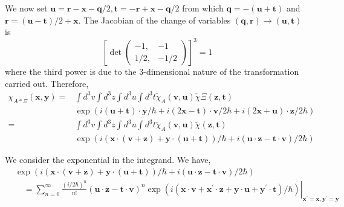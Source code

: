 \documentclass{article}
\begin{document}
We now set $\boldsymbol{u}=\boldsymbol{r}-\boldsymbol{x}-\boldsymbol{q} / 2, \boldsymbol{t}=-\boldsymbol{r}+\boldsymbol{x}-\boldsymbol{q} / 2$ from which $\boldsymbol{q}=-(\boldsymbol{u}+\boldsymbol{t})$ and $\boldsymbol{r}=(\boldsymbol{u}-\boldsymbol{t}) / 2+\boldsymbol{x}$. The Jacobian of the change of variables $(\boldsymbol{q}, \boldsymbol{r}) \rightarrow(\boldsymbol{u}, \boldsymbol{t})$ is
$$
\left[\operatorname{det}\left(\begin{array}{cc}
-1, & -1 \\
1 / 2, & -1 / 2
\end{array}\right)\right]^{3}=1
$$
where the third power is due to the 3-dimensional nature of the transformation carried out. Therefore,
$$
\begin{align*}
\chi_{A * \Xi}(\boldsymbol{x}, \boldsymbol{y})= & \int d^{3} v \int d^{3} z \int d^{3} u \int d^{3} t \tilde{\chi}_{A}(\boldsymbol{v}, \boldsymbol{u}) \tilde{\chi} \Xi(\boldsymbol{z}, \boldsymbol{t})  \tag{3.7.40}\\
& \exp (i(\boldsymbol{u}+\boldsymbol{t}) \cdot \boldsymbol{y} / \hbar+i(2 \boldsymbol{x}-\boldsymbol{t}) \cdot \boldsymbol{v} / 2 \hbar+i(2 \boldsymbol{x}+\boldsymbol{u}) \cdot \boldsymbol{z} / 2 \hbar) \\
= & \int d^{3} v \int d^{3} z \int d^{3} u \int d^{3} t \tilde{\chi}_{A}(\boldsymbol{v}, \boldsymbol{u}) \tilde{\chi}(\boldsymbol{z}, \boldsymbol{t}) \\
& \exp (i(\boldsymbol{x} \cdot(\boldsymbol{v}+\boldsymbol{z})+\boldsymbol{y} \cdot(\boldsymbol{u}+\boldsymbol{t})) / \hbar+i(\boldsymbol{u} \cdot \boldsymbol{z}-\boldsymbol{t} \cdot \boldsymbol{v}) / 2 \hbar)
\end{align*}
$$

We consider the exponential in the integrand. We have,
$$
\begin{align*}
& \exp (i(\boldsymbol{x} \cdot(\boldsymbol{v}+\boldsymbol{z})+\boldsymbol{y} \cdot(\boldsymbol{u}+\boldsymbol{t})) / \hbar+i(\boldsymbol{u} \cdot \boldsymbol{z}-\boldsymbol{t} \cdot \boldsymbol{v}) / 2 \hbar)  \tag{3.7.41}\\
& \quad=\left.\sum_{n=0}^{\infty} \frac{(i / 2 \hbar)^{n}}{n!}(\boldsymbol{u} \cdot \boldsymbol{z}-\boldsymbol{t} \cdot \boldsymbol{v})^{n} \exp \left(i\left(\boldsymbol{x} \cdot \boldsymbol{v}+\boldsymbol{x}^{\prime} \cdot \boldsymbol{z}+\boldsymbol{y} \cdot \boldsymbol{u}+\boldsymbol{y}^{\prime} \cdot \boldsymbol{t}\right) / \hbar\right)\right|_{\boldsymbol{x}^{\prime}=\boldsymbol{x}, \boldsymbol{y}^{\prime}=\boldsymbol{y}}
\end{align*}
$$
\end{document}
